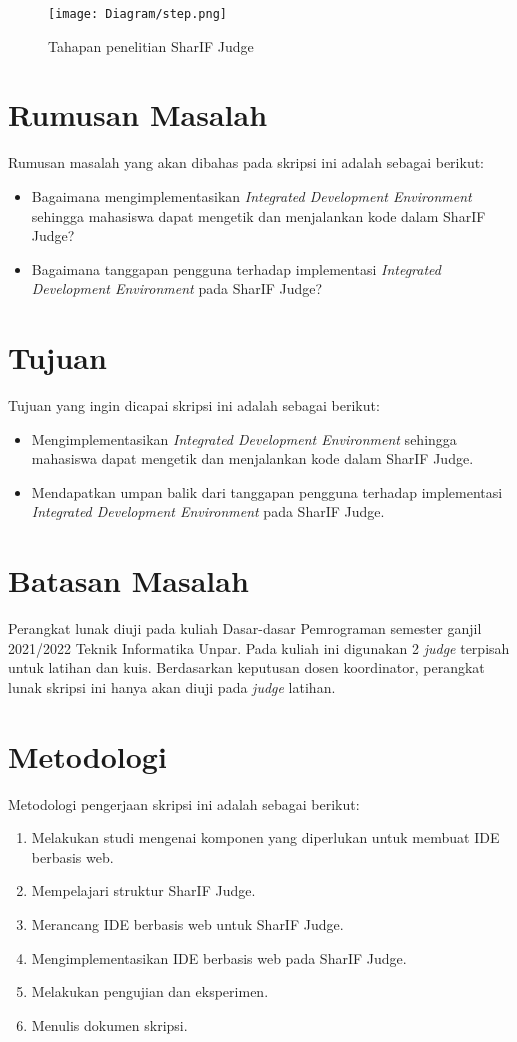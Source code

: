 \begin{figure}[H]
	\centering  
	\texttt{[image: Diagram/step.png]}  
	\caption{Tahapan penelitian SharIF Judge}
	\label{fig:1:step} 
\end{figure} 

\section{Rumusan Masalah}
\label{sec:rumusan}
Rumusan masalah yang akan dibahas pada skripsi ini adalah sebagai berikut:
\begin{itemize}
	\item Bagaimana mengimplementasikan {\it Integrated Development Environment} sehingga mahasiswa dapat mengetik dan menjalankan kode dalam SharIF Judge?
	\item Bagaimana tanggapan pengguna terhadap implementasi {\it Integrated Development Environment} pada SharIF Judge? 
\end{itemize}


\section{Tujuan}
\label{sec:tujuan}
Tujuan yang ingin dicapai skripsi ini adalah sebagai berikut:
\begin{itemize}
	\item Mengimplementasikan {\it Integrated Development Environment} sehingga mahasiswa dapat mengetik dan menjalankan kode dalam SharIF Judge.
	\item Mendapatkan umpan balik dari tanggapan pengguna terhadap implementasi {\it Integrated Development Environment} pada SharIF Judge.
\end{itemize}

\section{Batasan Masalah}
\label{sec:batasan}
Perangkat lunak diuji pada kuliah Dasar-dasar Pemrograman semester ganjil 2021/2022 Teknik Informatika Unpar. Pada kuliah ini digunakan 2 \textit{judge} terpisah untuk latihan dan kuis. Berdasarkan keputusan dosen koordinator, perangkat lunak skripsi ini hanya akan diuji pada \textit{judge} latihan.

\section{Metodologi}
\label{sec:metlit}
Metodologi pengerjaan skripsi ini adalah sebagai berikut:
\begin{enumerate}
	\item Melakukan studi mengenai komponen yang diperlukan untuk membuat IDE berbasis web.
	\item Mempelajari struktur SharIF Judge.
	\item Merancang IDE berbasis web untuk SharIF Judge.
	\item Mengimplementasikan IDE berbasis web pada SharIF Judge.
	\item Melakukan pengujian dan eksperimen.
	\item Menulis dokumen skripsi.
\end{enumerate}

